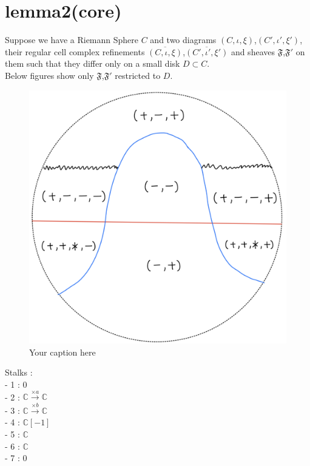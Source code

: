 \section{lemma2(core)}

\begin{lemma}
\end{lemma}
Suppose we have a Riemann Sphere $C$ and two diagrams $(C,\iota,\xi)$,$(C',\iota',\xi')$, their regular cell complex refinements $\overline{(C,\iota,\xi)}$,$\overline{(C',\iota',\xi')}$ and sheaves $\mathfrak{F}$,$\mathfrak{F}'$ on them such that they differ only on a small disk $D\subset C$.\\

Below figures show only $\mathfrak{F}$,$\mathfrak{F}'$ restricted to $D$.
\begin{figure}[H] %
    \centering
    \includegraphics[scale = 0.95]{diagrams/lemma2/1.png} %
    \caption{Your caption here}
    \label{fig:your-label}
\end{figure}

Stalks : \\
- 1 : 0\\
- 2 : $\mathbb{C}\xrightarrow{\times a}\mathbb{C}$\\
- 3 : $\mathbb{C}\xrightarrow{\times b}\mathbb{C}$\\
- 4 : $\mathbb{C}[-1]$ \\
- 5 : $\mathbb{C}$\\
- 6 : $\mathbb{C}$\\
- 7 : 0\\

